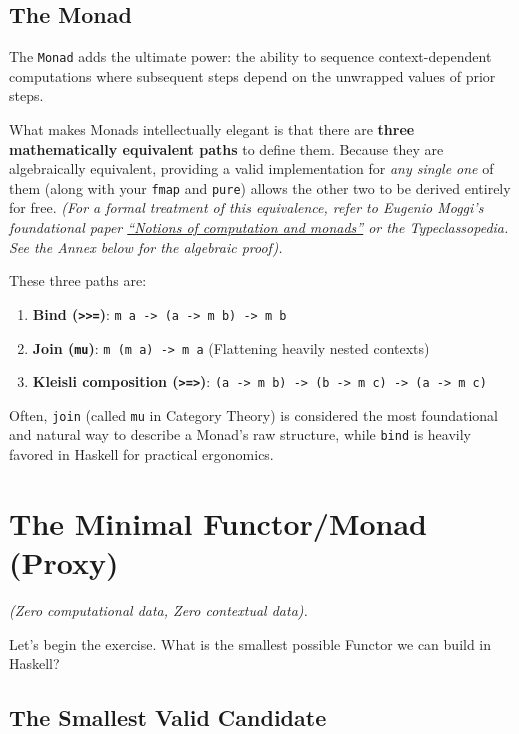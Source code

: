 \documentclass[12pt,a4paper]{article}
\begin{document}
\subsection{The Monad}

The \texttt{Monad} adds the ultimate power: the ability to sequence context-dependent computations where subsequent steps depend on the unwrapped values of prior steps.

What makes Monads intellectually elegant is that there are \textbf{three mathematically equivalent paths} to define them. Because they are algebraically equivalent, providing a valid implementation for \textit{any single one} of them (along with your \texttt{fmap} and \texttt{pure}) allows the other two to be derived entirely for free. 
\textit{(For a formal treatment of this equivalence, refer to Eugenio Moggi's foundational paper \href{https://core.ac.uk/download/pdf/82121775.pdf}{``Notions of computation and monads''} or the Typeclassopedia. See the Annex below for the algebraic proof).}

These three paths are:
\begin{enumerate}
    \item \textbf{Bind (\texttt{>>=})}: \texttt{m a -> (a -> m b) -> m b}
    \item \textbf{Join (\texttt{mu})}: \texttt{m (m a) -> m a} (Flattening heavily nested contexts)
    \item \textbf{Kleisli composition (\texttt{>=>})}: \texttt{(a -> m b) -> (b -> m c) -> (a -> m c)}
\end{enumerate}

Often, \texttt{join} (called \texttt{mu} in Category Theory) is considered the most foundational and natural way to describe a Monad's raw structure, while \texttt{bind} is heavily favored in Haskell for practical ergonomics.

\section{The Minimal Functor/Monad (Proxy)}

\textit{(Zero computational data, Zero contextual data).}

Let's begin the exercise. What is the smallest possible Functor we can build in Haskell?

\subsection{The Smallest Valid Candidate}
\end{document}

